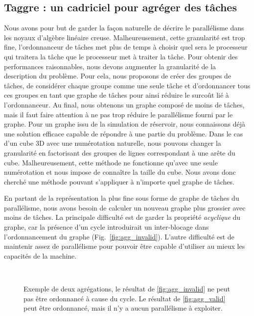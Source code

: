 \subsection{Taggre : un cadriciel pour agréger des tâches}
Nous avons pour but de garder la façon naturelle de décrire le parallélisme dans les noyaux d'algèbre linéaire creuse.
%
Malheureusement, cette granularité est trop fine, l'ordonnanceur de tâches met plus de temps à choisir quel sera le processeur qui traitera la tâche que le processeur met à traiter la tâche.
%
Pour obtenir des performances raisonnables, nous devons augmenter la granularité de la description du problème.
%
Pour cela, nous proposons de créer des groupes de tâches, de considérer chaque groupe comme une seule tâche et d'ordonnancer tous ces groupes en tant que graphe de tâches pour ainsi réduire le surcoût lié à l'ordonnanceur.
%
Au final, nous obtenons un graphe composé de moins de tâches, mais il faut faire attention à ne pas trop réduire le parallélisme fourni par le graphe.
%
Pour un graphe issu de la simulation de réservoir, nous connaissons déjà une solution efficace capable de répondre à une partie du problème.
%
Dans le cas d'un cube 3D avec une numérotation naturelle, nous pouvons changer la granularité en factorisant des groupes de lignes correspondant à une arête du cube.
%
Malheureusement, cette méthode ne fonctionne qu'avec une seule numérotation et nous impose de connaître la taille du cube.
%
Nous avons donc cherché une méthode pouvant s'appliquer à n'importe quel graphe de tâches.


En partant de la représentation la plus fine sous forme de graphe de tâches du parallélisme, nous avons besoin de calculer un nouveau graphe plus grossier avec moins de tâches.
%
La principale difficulté est de garder la propriété {\em acyclique} du graphe, car la présence d'un cycle introduirait un inter-blocage dans l'ordonnancement du graphe (Fig.~\ref{fig:agg_invalid}).
%
L'autre difficulté est de maintenir assez de parallélisme pour pouvoir être capable d'utiliser au mieux les capacités de la machine.


\begin{figure}[!h]
     \begin{center}
        ~
    \end{center}
    \caption{Exemple de deux agrégations, le résultat de \ref{fig:agg_invalid} ne peut pas être ordonnancé à cause du cycle. Le résultat de \ref{fig:agg_valid} peut être ordonnancé, mais il n'y a aucun parallélisme à exploiter.}
    \label{fig:agg_basic}
\end{figure}


